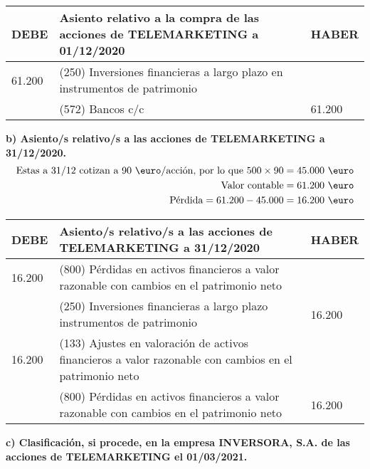 \begin{table}[H]
    \centering
    \begin{tabular}{|p{3cm}|p{6cm}|p{3cm}|}
    \hline
    \rowcolor{blue!30}
    \textbf{DEBE} & \textbf{Asiento relativo a la compra de las acciones de TELEMARKETING a 01/12/2020} & \textbf{HABER} \\
    \hline
    61.200 & (250) Inversiones financieras a largo plazo en instrumentos de patrimonio & \\
    \hline
    & (572) Bancos c/c & 61.200 \\
    \hline
    \end{tabular}
\end{table}





\textbf{b) Asiento/s relativo/s a las acciones de TELEMARKETING a 31/12/2020.
}
\begin{align*}
    \text{Estas a 31/12 cotizan a 90 \euro/acción, por lo que } 500 \times 90 = \text{45.000} \text{ \euro} \\
    \text{Valor contable} = 61.200 \text{ \euro} \\
    \text{Pérdida} = 61.200 - 45.000 = 16.200 \text{ \euro}
\end{align*}

\begin{table}[H]
    \centering
    \begin{tabular}{|p{3cm}|p{6cm}|p{3cm}|}
    \hline
    \rowcolor{blue!30}
    \textbf{DEBE} & \textbf{Asiento/s relativo/s a las acciones de TELEMARKETING a 31/12/2020} & \textbf{HABER} \\
    \hline
    16.200 & (800) Pérdidas en activos financieros a valor razonable con cambios en el patrimonio neto & \\
    \hline
    & (250) Inversiones financieras a largo plazo instrumentos de patrimonio & 16.200 \\
    \hline
    16.200 & (133) Ajustes en valoración de activos financieros a valor razonable con cambios en el patrimonio neto & \\
    \hline
    & (800) Pérdidas en activos financieros a valor razonable con cambios en el patrimonio neto & 16.200 \\
    \hline
    \end{tabular}
\end{table}


\textbf{c) Clasificación, si procede, en la empresa INVERSORA, S.A. de las acciones de TELEMARKETING el 01/03/2021.}

